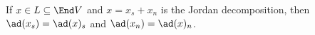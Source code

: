 If $x \in L \subseteq \End V$ and $x = x_s + x_n$ is the Jordan decomposition,
then $\ad(x_s) = \ad(x)_s$ and $\ad(x_n) = \ad(x)_n$.

